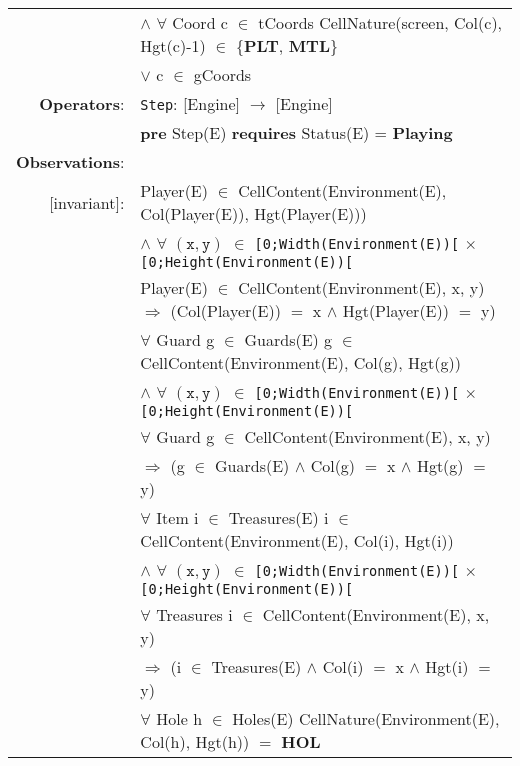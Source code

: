 \documentclass[8pt]{article}
\begin{document}
{\begin{longtable}{rl}
  & \quad\quad\quad $\land$ $\forall$ \textrm{Coord} c $\in$ tCoords \textrm{CellNature(screen, Col(c), Hgt(c)-1)} $\in$ \{\textbf{PLT}, \textbf{MTL}\} \\
  & \quad\quad\quad\quad\quad $\lor$ c $\in$ gCoords \\
  \textbf{Operators}: &\texttt{Step}: \textrm{[Engine]} $\rightarrow$ \textrm{[Engine]} \\
  & \quad \textbf{pre} \textrm{Step(E)} \textbf{requires} \textrm{Status(E)} = \textbf{Playing}\\
  \textbf{Observations}:&\\
  \textrm{[invariant]}:& \textrm{Player(E)} $\in$ \textrm{CellContent(Environment(E), Col(Player(E)), Hgt(Player(E)))}\\
  & \quad\quad $\land$ $\forall$ $(\mathtt{x},\mathtt{y})$ $\in$ \texttt{[0;Width(Environment(E))[} $\times$ \texttt{[0;Height(Environment(E))[}\\
  & \quad\quad\quad\quad \textrm{Player(E)} $\in$ \textrm{CellContent(Environment(E), x, y)} $\Rightarrow$ (\textrm{Col(Player(E))} $=$ x $\land$ \textrm{Hgt(Player(E))} $=$ y)\\
  & $\forall$ \textrm{Guard} g $\in$ \textrm{Guards(E)} g $\in$ \textrm{CellContent(Environment(E), Col(g), Hgt(g))}\\
  & \quad\quad $\land$ $\forall$ $(\mathtt{x},\mathtt{y})$ $\in$ \texttt{[0;Width(Environment(E))[} $\times$ \texttt{[0;Height(Environment(E))[}\\
  & \quad\quad\quad\quad $\forall$ \textrm{Guard} g $\in$ \textrm{CellContent(Environment(E), x, y)} \\
  & \quad\quad\quad\quad\quad\quad $\Rightarrow$ (g $\in$ \textrm{Guards(E)} $\land$ \textrm{Col(g)} $=$ x $\land$ \textrm{Hgt(g)} $=$ y)\\
  & $\forall$ \textrm{Item} i $\in$ \textrm{Treasures(E)} i $\in$ \textrm{CellContent(Environment(E), Col(i), Hgt(i))}\\
  & \quad\quad $\land$ $\forall$ $(\mathtt{x},\mathtt{y})$ $\in$ \texttt{[0;Width(Environment(E))[} $\times$ \texttt{[0;Height(Environment(E))[}\\
  & \quad\quad\quad\quad $\forall$ \textrm{Treasures} i $\in$ \textrm{CellContent(Environment(E), x, y)} \\
  & \quad\quad\quad\quad\quad\quad $\Rightarrow$ (i $\in$ \textrm{Treasures(E)} $\land$ \textrm{Col(i)} $=$ x $\land$ \textrm{Hgt(i)} $=$ y)\\
  & $\forall$ \textrm{Hole} h $\in$ \textrm{Holes(E)} CellNature(Environment(E), Col(h), Hgt(h)) $=$ \textbf{HOL}\\

\end{longtable}}
\end{document}
